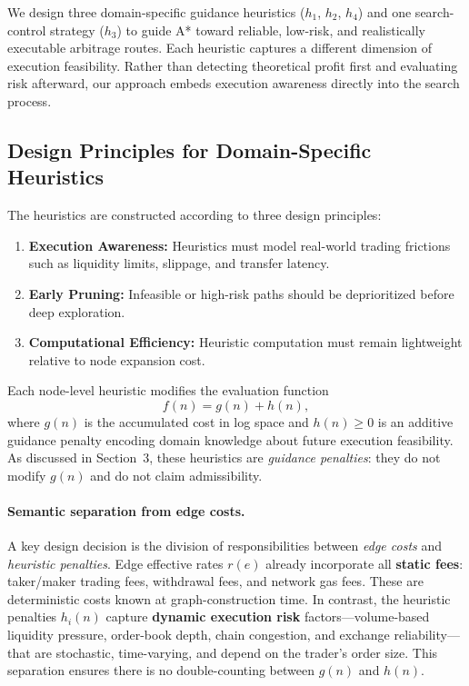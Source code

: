 We design three domain-specific guidance heuristics ($h_1$, $h_2$, $h_4$) and one search-control strategy ($h_3$) to guide A* toward reliable, low-risk, and realistically executable arbitrage routes. Each heuristic captures a different dimension of execution feasibility. Rather than detecting theoretical profit first and evaluating risk afterward, our approach embeds execution awareness directly into the search process.

\subsection{Design Principles for Domain-Specific Heuristics}

The heuristics are constructed according to three design principles:

\begin{enumerate}
    \item \textbf{Execution Awareness:} Heuristics must model real-world trading frictions such as liquidity limits, slippage, and transfer latency.
    \item \textbf{Early Pruning:} Infeasible or high-risk paths should be deprioritized before deep exploration.
    \item \textbf{Computational Efficiency:} Heuristic computation must remain lightweight relative to node expansion cost.
\end{enumerate}

Each node-level heuristic modifies the evaluation function
\[
f(n) = g(n) + h(n),
\]
where $g(n)$ is the accumulated cost in log space and $h(n) \geq 0$ is an additive guidance penalty encoding domain knowledge about future execution feasibility. As discussed in Section~3, these heuristics are \emph{guidance penalties}: they do not modify $g(n)$ and do not claim admissibility.

\paragraph{Semantic separation from edge costs.}
A key design decision is the division of responsibilities between \emph{edge costs} and \emph{heuristic penalties}. Edge effective rates $r(e)$ already incorporate all \textbf{static fees}: taker/maker trading fees, withdrawal fees, and network gas fees. These are deterministic costs known at graph-construction time. In contrast, the heuristic penalties $h_i(n)$ capture \textbf{dynamic execution risk} factors---volume-based liquidity pressure, order-book depth, chain congestion, and exchange reliability---that are stochastic, time-varying, and depend on the trader's order size. This separation ensures there is no double-counting between $g(n)$ and $h(n)$.

